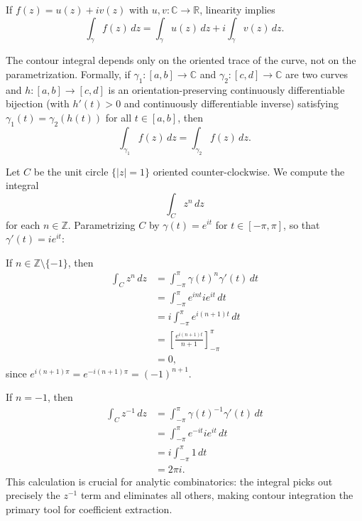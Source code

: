 If \(f(z) = u(z) + i v(z)\) with \(u, v \colon \mathbb{C} \to \mathbb{R}\), linearity implies
\[
    \int_\gamma f(z) \, dz = \int_\gamma u(z) \, dz + i \int_\gamma v(z) \, dz.
\]

\begin{proposition}
    The contour integral depends only on the oriented trace of the curve, not on the parametrization.
    Formally, if \(\gamma_1 \colon [a, b] \to \mathbb{C}\) and \(\gamma_2 \colon [c, d] \to \mathbb{C}\) are two curves and \(h \colon [a, b] \to [c, d]\) is an orientation-preserving continuously differentiable bijection (with \(h'(t) > 0\) and continuously differentiable inverse) satisfying \(\gamma_1(t) = \gamma_2(h(t))\) for all \(t \in [a, b]\), then
    \[
        \int_{\gamma_1} f(z) \, dz = \int_{\gamma_2} f(z) \, dz.
    \]
\end{proposition}

\begin{example}
    Let \(C\) be the unit circle \(\{|z| = 1\}\) oriented counter-clockwise.
    We compute the integral
    \[
        \int_C z^n \, dz
    \]
    for each \(n \in \mathbb{Z}\).
    Parametrizing \(C\) by \(\gamma(t) = e^{it}\) for \(t \in [-\pi, \pi]\), so that \(\gamma'(t) = i e^{it}\):
    
    If \(n \in \mathbb{Z} \setminus \{-1\}\), then
    \begin{align*}
        \int_C z^n \, dz
        &= \int_{-\pi}^{\pi} \gamma(t)^n \gamma'(t) \, dt \\
        &= \int_{-\pi}^{\pi} e^{int} i e^{it} \, dt \\
        &= i \int_{-\pi}^{\pi} e^{i(n+1)t} \, dt \\
        &= \left[ \frac{e^{i(n+1)t}}{n+1} \right]_{-\pi}^{\pi} \\
        &= 0,
    \end{align*}
    since \(e^{i(n+1)\pi} = e^{-i(n+1)\pi} = (-1)^{n+1}\).

    If \(n = -1\), then
    \begin{align*}
        \int_C z^{-1} \, dz
        &= \int_{-\pi}^{\pi} \gamma(t)^{-1} \gamma'(t) \, dt \\
        &= \int_{-\pi}^{\pi} e^{-it} i e^{it} \, dt \\
        &= i \int_{-\pi}^{\pi} 1 \, dt \\
        &= 2\pi i.
    \end{align*}
    This calculation is crucial for analytic combinatorics: the integral picks out precisely the \(z^{-1}\) term and eliminates all others, making contour integration the primary tool for coefficient extraction.
\end{example}

